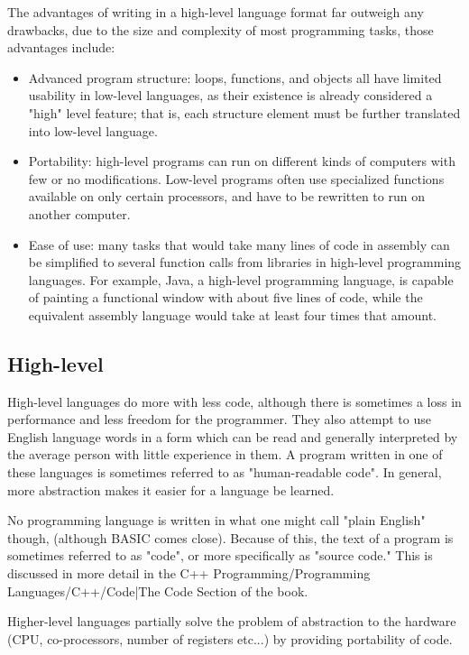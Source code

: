 The advantages of writing in a high-level language format far outweigh any
drawbacks, due to the size and complexity of most programming tasks, those
advantages include:

\begin{itemize}
\item Advanced program structure: loops, functions, and objects all have
limited usability in low-level languages, as their existence is already
considered a "high" level feature; that is, each structure element must be
further translated into low-level language.
\item Portability: high-level programs can run on different kinds of computers
with few or no modifications. Low-level programs often use specialized
functions available on only certain processors, and have to be rewritten to run
on another computer.
\item Ease of use: many tasks that would take many lines of code in assembly
can be simplified to several function calls from libraries in high-level
programming languages. For example, Java, a high-level programming language, is
capable of painting a functional window with about five lines of code, while
the equivalent assembly language would take at least four times that amount.
\end{itemize}

\subsection{High-level}
High-level languages do more with less code, although there is sometimes a loss
in performance and less freedom for the programmer. They also attempt to use
English language words in a form which can be read and generally interpreted by
the average person with little experience in them. A program written in one of
these languages is sometimes referred to as "human-readable code".  In general,
more abstraction makes it easier for a language be learned. 

No programming language is written in what one might call "plain English"
though, (although BASIC comes close). Because of this, the text of a program is
sometimes referred to as "code", or more specifically as "source code."  This
is discussed in more detail in the C++ Programming/Programming
Languages/C++/Code|The Code Section of the book.

Higher-level languages partially solve the problem of abstraction to the
hardware (CPU, co-processors, number of registers etc...) by providing
portability of code.

